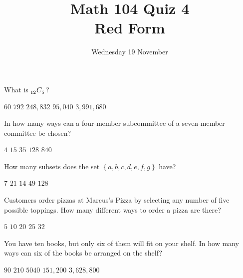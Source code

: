 \documentclass[answers,12pt]{exam}
\title{Math 104 Quiz 4\\Red Form}
\date{Wednesday 19 November}
\newcommand\ncr[2]{\tensor[_{#1}]C{_{#2}}}
\begin{document}
\maketitle
\begin{center}
\end{center}

\begin{questions}

\question What is $\ncr{12}{5}$?\\
\begin{oneparchoices}
\choice $60$ %
\correctchoice $792$
\choice $248,832$ %
\choice $95,040$ %
\choice $3,991,680$ %
\end{oneparchoices}

\question In how many ways can a four-member subcommittee
of a seven-member committee be chosen?\\
\begin{oneparchoices}
\choice $4$ %
\choice $15$ %
\correctchoice $35$
\choice $128$ %
\choice $840$ %
\end{oneparchoices}

\question How many subsets does the set
$\left\{a,b,c,d,e,f,g\right\}$ have?\\
\begin{oneparchoices}
\choice $7$ %
\choice $21$ %
\choice $14$ %
\choice $49$ %
\correctchoice $128$
\end{oneparchoices}

\question Customers order pizzas at Marcus's Pizza
by selecting any number of five possible toppings.
How many different ways to order a pizza are there?\\
\begin{oneparchoices}
\choice $5$ %
\choice $10$ %
\choice $20$ %
\choice $25$ %
\correctchoice $32$
\end{oneparchoices}

\question You have ten books, but only six
of them will fit on your shelf. In how many 
ways can six of the books be arranged on the shelf?\\
\begin{oneparchoices}
\choice $90$ %
\choice $210$ %
\choice $5040$ %
\correctchoice $151,200$
\choice $3,628,800$ %
\end{oneparchoices}


\end{questions}
\end{document}
